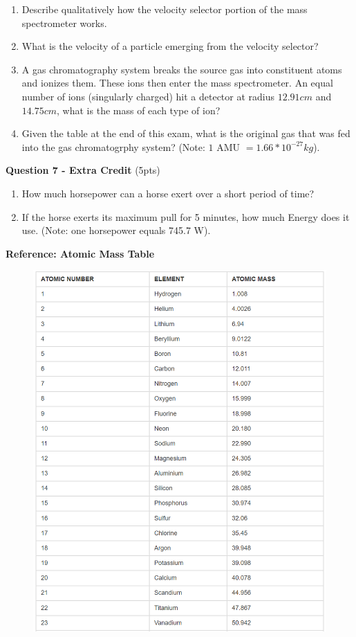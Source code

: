 \documentclass[14pt]{report}
\begin{document}
\begin{enumerate} [label=\Alph*]
\item Describe qualitatively how the velocity selector portion of the mass spectrometer works.
\item What is the velocity of a particle emerging from the velocity selector?
\item A gas chromatography system breaks the source gas into constituent atoms and ionizes them. These ions then enter the mass spectrometer. An equal number of ions (singularly charged) hit a detector at radius $12.91cm$ and $14.75cm$, what is the mass of each type of ion?
\item Given the table at the end of this exam, what is the original gas that was fed into the gas chromatogrphy system? (Note: $1$ AMU $= 1.66 * 10^{-27} kg$).

\end{enumerate}

\textbf{Question 7 - Extra Credit} (5pts)
\begin{enumerate}[label=\Alph*]
\item How much horsepower can a horse exert over a short period of time?
\item If the horse exerts its maximum pull for 5 minutes, how much Energy does it use. (Note: one horsepower equals 745.7 W).
\end{enumerate}

\textbf{Reference: Atomic Mass Table}

\begin{figure}[H]
\begin{center}
\includegraphics[scale=0.80]{amu.png}
\end{center}
\end{figure}
 
\end{document}

